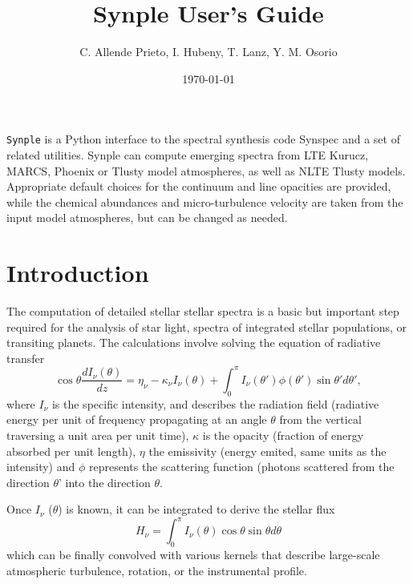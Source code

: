\documentclass[]{article}
\begin{document}
\title{Synple User's Guide}

\date{\today}
\author{C. Allende Prieto, I. Hubeny, T. Lanz, Y. M. Osorio}

\maketitle

{\tt Synple} is a Python interface to the spectral synthesis code Synspec
and a set of related utilities. Synple can compute emerging spectra from LTE Kurucz, 
MARCS, Phoenix or Tlusty model atmospheres, as well as NLTE Tlusty models. Appropriate 
default choices for the continuum and line opacities are provided, while the chemical 
abundances and micro-turbulence velocity are taken from the input model atmospheres, but
can be changed as needed.

\tableofcontents

\newpage

\section{Introduction}
\label{intro}

The computation of detailed stellar stellar spectra is a basic but important step required for the analysis of star light,  spectra of integrated stellar populations, or transiting planets. The calculations involve solving the equation of radiative transfer
\begin{equation}
\cos \theta \frac{d I_{\nu} (\theta)}{dz} = \eta_{\nu} - \kappa_{\nu}  I_{\nu} (\theta) + \int_0^{\pi} I_{\nu} (\theta') \phi (\theta') \sin \theta' d\theta',
\end{equation}
\noindent where $I_{\nu}$ is the specific intensity, and describes the radiation field (radiative energy per unit of frequency propagating at an angle $\theta$ from the vertical traversing a unit area per unit time), $\kappa$ is the opacity (fraction of energy absorbed per unit length), $\eta$ the emissivity (energy emited, same units as the intensity) and $\phi$ represents the scattering function (photons scattered from the direction $\theta$' into the direction $\theta$. 

Once $I_{\nu}$ ($\theta$) is known, it can be integrated to derive the stellar flux
\begin{equation}
H_{\nu} = \int_0^{\pi} I_{\nu} (\theta) \cos \theta \sin \theta d\theta
\label{flux}
\end{equation}
\noindent which can be finally convolved with various kernels that describe large-scale atmospheric turbulence, rotation, or the instrumental profile.
\end{document}
